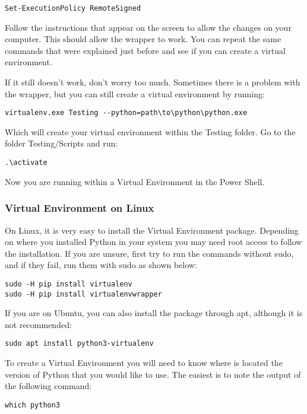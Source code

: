 \begin{verbatim}
Set-ExecutionPolicy RemoteSigned
\end{verbatim}

Follow the instructions that appear on the screen to allow the changes on your computer. This should allow the wrapper to work. You can repeat the same commands that were explained just before and see if you can create a virtual environment.

If it still doesn’t work, don’t worry too much. Sometimes there is a problem with the wrapper, but you can still create a virtual environment by running:
\begin{verbatim}
virtualenv.exe Testing --python=path\to\python\python.exe
\end{verbatim}

Which will create your virtual environment within the Testing folder. Go to the folder Testing/Scripts and run:
\begin{verbatim}
.\activate
\end{verbatim}

Now you are running within a Virtual Environment in the Power Shell.

\subsubsection{Virtual Environment on Linux}
On Linux, it is very easy to install the Virtual Environment package. Depending on where you installed Python in your system you may need root access to follow the installation. If you are unsure, first try to run the commands without sudo, and if they fail, run them with sudo as shown below:

\begin{verbatim}
sudo -H pip install virtualenv
sudo -H pip install virtualenvwrapper
\end{verbatim}

If you are on Ubuntu, you can also install the package through apt, although it is not recommended:
\begin{verbatim}
sudo apt install python3-virtualenv
\end{verbatim}

To create a Virtual Environment you will need to know where is located the version of Python that you would like to use. The easiest is to note the output of the following command:

\begin{verbatim}
which python3
\end{verbatim}

